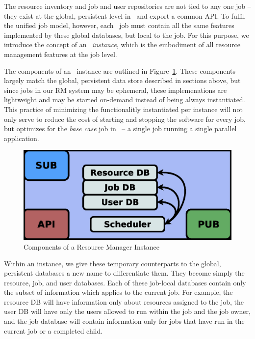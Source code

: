 The resource inventory and job and user repositories are
not tied to any one job -- they exist at the global, persistent
level in \ngrm\ and export a common API.  To fulfil the unified
job model, however, each \ngrm\ job must contain all the
same features implemented by these global databases, but local
to the job. For this purpose, we introduce the concept of
an \ngrm\ \emph{instance}, which is the embodiment of all
resource management features at the job level.

The components of an \ngrm\ instance are outlined in
Figure~\ref{fig:rminstance}.  These components largely match the
global, persistent data store described in sections above, but since
jobs in our RM system may be ephemeral, these implemenations are
lightweight and may be started on-demand instead of being always
instantiated. This practice of minimizing the functionalitly
instantiated per instance will not only serve to reduce the cost
of starting and stopping the software for every job, but optimizes
for the \emph{base case} job in \ngrm\ -- a single job running a
single parallel application.

\begin{figure}
\centering
\includegraphics[scale=0.30]{../fig/RM-instance.eps}
\caption{Components of a Resource Manager Instance}
\label{fig:rminstance}
\end{figure}

Within an instance, we give these temporary counterparts to the
global, persistent databases a new name to differentiate them. They
become simply the resource, job, and user databases. Each of
these job-local databases contain only the subset of information
which applies to the current job. For example, the resource DB
will have information only about resources assigned to the job, the
user DB will have only the users allowed to run within the job and
the job owner, and the job database will contain information only
for jobs that have run in the current job or a completed child.

